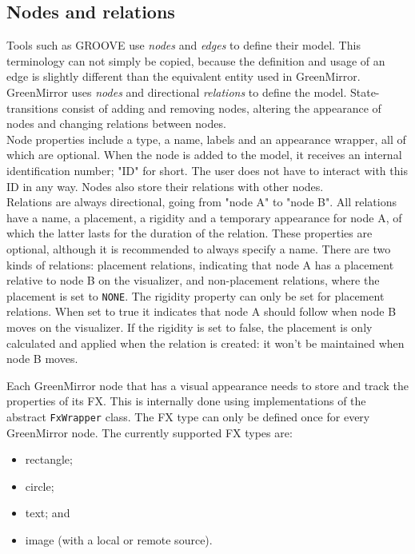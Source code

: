 \subsection{Nodes and relations}\label{sec:features;sub:nodrel}
Tools such as GROOVE \cite{rensink2004} use \emph{nodes} and \emph{edges} to define their model. This terminology can not simply be copied, because the definition and usage of an edge is slightly different than the equivalent entity used in GreenMirror. GreenMirror uses \emph{nodes} and directional \emph{relations} to define the model. State-transitions consist of adding and removing nodes, altering the appearance of nodes and changing relations between nodes. \\
Node properties include a type, a name, labels and an appearance wrapper, all of which are optional. When the node is added to the model, it receives an internal identification number; "ID" for short. The user does not have to interact with this ID in any way. Nodes also store their relations with other nodes. \\
Relations are always directional, going from "node A" to "node B". All relations have a name, a placement, a rigidity and a temporary appearance for node A, of which the latter lasts for the duration of the relation. These properties are optional, although it is recommended to always specify a name. There are two kinds of relations: placement relations, indicating that node A has a placement relative to node B on the visualizer, and non-placement relations, where the placement is set to \lstinline{NONE}. The rigidity property can only be set for placement relations. When set to true it indicates that node A should follow when node B moves on the visualizer. If the rigidity is set to false, the placement is only calculated and applied when the relation is created: it won't be maintained when node B moves.
\par Each GreenMirror node that has a visual appearance needs to store and track the properties of its FX. This is internally done using implementations of the abstract \lstinline{FxWrapper} class. The FX type can only be defined once for every GreenMirror node. The currently supported FX types are:
\begin{itemize}
\item rectangle;
\item circle;
\item text; and
\item image (with a local or remote source).
\end{itemize}
